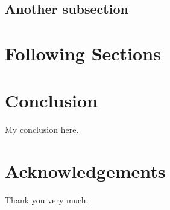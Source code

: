 \documentclass[11pt,a4paper,onecolumn,oneside]{report}
\begin{document}
\subsection{Another subsection}


\newpage 
\section{Following Sections} 


\newpage 
\section{Conclusion} 
My conclusion here.

\clearpage



\clearpage

\section*{\hfill \Large Acknowledgements \hfill}
Thank you very much.
\clearpage


\hbox{ }
\thispagestyle{empty}
\clearpage
\end{document}
